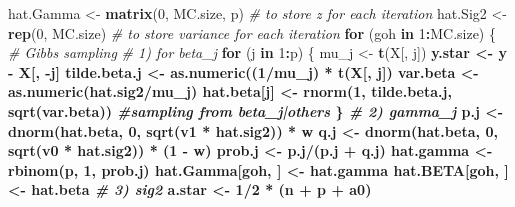 \documentclass[]{book}
\newenvironment{Shaded}{\begin{snugshade}}{\end{snugshade}}
\newcommand{\CommentTok}[1]{\textcolor[rgb]{0.56,0.35,0.01}{\textit{#1}}}
\newcommand{\ControlFlowTok}[1]{\textcolor[rgb]{0.13,0.29,0.53}{\textbf{#1}}}
\newcommand{\DecValTok}[1]{\textcolor[rgb]{0.00,0.00,0.81}{#1}}
\newcommand{\KeywordTok}[1]{\textcolor[rgb]{0.13,0.29,0.53}{\textbf{#1}}}
\newcommand{\NormalTok}[1]{#1}
\newcommand{\OperatorTok}[1]{\textcolor[rgb]{0.81,0.36,0.00}{\textbf{#1}}}
\newcommand{\StringTok}[1]{\textcolor[rgb]{0.31,0.60,0.02}{#1}}
\begin{document}
\begin{Shaded}
\begin{Highlighting}[]
{{{\NormalTok{hat.Gamma <-}\StringTok{ }\KeywordTok{matrix}\NormalTok{(}\DecValTok{0}\NormalTok{, MC.size, p) }\CommentTok{# to store z for each iteration}
\NormalTok{hat.Sig2 <-}\StringTok{ }\KeywordTok{rep}\NormalTok{(}\DecValTok{0}\NormalTok{, MC.size) }\CommentTok{# to store variance for each iteration}
\ControlFlowTok{for}\NormalTok{ (goh }\ControlFlowTok{in} \DecValTok{1}\OperatorTok{:}\NormalTok{MC.size) \{}
  \CommentTok{# Gibbs sampling }
  \CommentTok{# 1) for beta_j}
  \ControlFlowTok{for}\NormalTok{ (j }\ControlFlowTok{in} \DecValTok{1}\OperatorTok{:}\NormalTok{p) \{}
\NormalTok{    mu_j <-}\StringTok{ }\KeywordTok{t}\NormalTok{(X[, j]) }\OperatorTok{%*%}\StringTok{ }\NormalTok{X[, j] }\OperatorTok{+}\StringTok{ }\DecValTok{1}\OperatorTok{/}\NormalTok{v01[(hat.gamma[j] }\OperatorTok{+}\StringTok{ }\DecValTok{1}\NormalTok{)]}
\NormalTok{    y.star <-}\StringTok{ }\NormalTok{y }\OperatorTok{-}\StringTok{ }\NormalTok{X[, }\OperatorTok{-}\NormalTok{j] }\OperatorTok{%*%}\StringTok{ }\NormalTok{hat.beta[}\OperatorTok{-}\NormalTok{j]}
\NormalTok{    tilde.beta.j <-}\StringTok{ }\KeywordTok{as.numeric}\NormalTok{((}\DecValTok{1}\OperatorTok{/}\NormalTok{mu_j) }\OperatorTok{*}\StringTok{ }\KeywordTok{t}\NormalTok{(X[, j]) }\OperatorTok{%*%}\StringTok{ }\NormalTok{y.star)}
\NormalTok{    var.beta <-}\StringTok{ }\KeywordTok{as.numeric}\NormalTok{(hat.sig2}\OperatorTok{/}\NormalTok{mu_j)}
\NormalTok{    hat.beta[j] <-}\StringTok{ }\KeywordTok{rnorm}\NormalTok{(}\DecValTok{1}\NormalTok{, tilde.beta.j, }\KeywordTok{sqrt}\NormalTok{(var.beta))  }\CommentTok{#sampling from beta_j|others}
\NormalTok{  \}}
  \CommentTok{# 2) gamma_j}
\NormalTok{  p.j <-}\StringTok{ }\KeywordTok{dnorm}\NormalTok{(hat.beta, }\DecValTok{0}\NormalTok{, }\KeywordTok{sqrt}\NormalTok{(v1 }\OperatorTok{*}\StringTok{ }\NormalTok{hat.sig2)) }\OperatorTok{*}\StringTok{ }\NormalTok{w}
\NormalTok{  q.j <-}\StringTok{ }\KeywordTok{dnorm}\NormalTok{(hat.beta, }\DecValTok{0}\NormalTok{, }\KeywordTok{sqrt}\NormalTok{(v0 }\OperatorTok{*}\StringTok{ }\NormalTok{hat.sig2)) }\OperatorTok{*}\StringTok{ }\NormalTok{(}\DecValTok{1} \OperatorTok{-}\StringTok{ }\NormalTok{w)}
\NormalTok{  prob.j <-}\StringTok{ }\NormalTok{p.j}\OperatorTok{/}\NormalTok{(p.j }\OperatorTok{+}\StringTok{ }\NormalTok{q.j)}
\NormalTok{  hat.gamma <-}\StringTok{ }\KeywordTok{rbinom}\NormalTok{(p, }\DecValTok{1}\NormalTok{, prob.j)}
\NormalTok{  hat.Gamma[goh, ] <-}\StringTok{ }\NormalTok{hat.gamma}
\NormalTok{  hat.BETA[goh, ] <-}\StringTok{ }\NormalTok{hat.beta}
  \CommentTok{# 3) sig2}
\NormalTok{  a.star <-}\StringTok{ }\DecValTok{1}\OperatorTok{/}\DecValTok{2} \OperatorTok{*}\StringTok{ }\NormalTok{(n }\OperatorTok{+}\StringTok{ }\NormalTok{p }\OperatorTok{+}\StringTok{ }\NormalTok{a0)}
}}}}}}
\end{Highlighting}
\end{Shaded}
\end{document}
